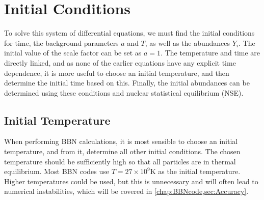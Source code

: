 
\section{Initial Conditions}
To solve this system of differential equations, we must find the initial conditions for time, the background parameters $a$ and $T$, as well as the abundances $Y_i$.
The initial value of the scale factor can be set as $a=1$. The temperature and time are directly linked, and as none of the earlier equations have any explicit time dependence, it is more useful to choose an initial temperature, and then determine the initial time based on this. Finally, the initial abundances can be determined using these conditions and nuclear statistical equilibrium (NSE).

\subsection{Initial Temperature}
When performing BBN calculations, it is most sensible to choose an initial temperature, and from it, determine all other initial conditions. The chosen temperature should be sufficiently high so that all particles are in thermal equilibrium. Most BBN codes use $T=27\times10^9$K as the initial temperature. Higher temperatures could be used, but this is unnecessary and will often lead to numerical instabilities, which will be covered in \cref{chap:BBNcode,sec:Accuracy}.

